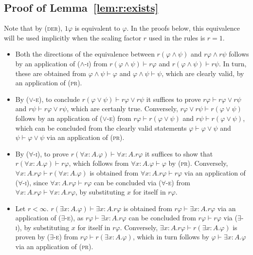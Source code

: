 \documentclass[a4paper,UKenglish,cleveref, autoref, thm-restate]{lipics-v2021}
\begin{document}
\subsection*{Proof of Lemma~\ref{lem:r:exists}}
Note that by (\textsc{der}), $1\varphi$ is equivalent to $\varphi$. In the proofs below, this equivalence will be used implicitly when the scaling factor $r$ used in the rules is $r = 1$. 
\begin{itemize}
\item Both the directions of the equivalence between $r(\varphi \wedge \psi)$ and $r\varphi \wedge r\psi$ follows by an application of (\textsc{$\wedge$-i}) from $r(\varphi \wedge \psi) \vdash r\varphi$ and $r(\varphi \wedge \psi) \vdash r\psi$. In turn, these are obtained from $\varphi \wedge \psi \vdash \varphi$ and $\varphi \wedge \psi \vdash \psi$, which are clearly valid, by an application of (\textsc{pr}).

\item By (\textsc{$\vee$-e}), to conclude $r(\varphi \vee \psi) \vdash r\varphi \vee r\psi$ it 
suffices to prove $r\varphi \vdash r\varphi \vee r\psi$ and $r\psi \vdash r\varphi \vee r\psi$, which are certanly true.
Conversely, $r\varphi \vee r\psi \vdash r(\varphi \vee \psi)$ follows by an application of (\textsc{$\vee$-e}) from $r\varphi \vdash r(\varphi \vee \psi)$ and $r\psi \vdash r(\varphi \vee \psi)$, which can be concluded from the clearly valid statements $\varphi \vdash \varphi \vee \psi$ and $\psi \vdash \varphi \vee \psi$ via an application of (\textsc{pr}).

\item By (\textsc{$\forall$-i}), to prove $r(\forall x:A. \varphi) \vdash \forall x:A. r\varphi$ it 
suffices to show that $r(\forall x:A. \varphi) \vdash r\varphi$, which follows from $\forall x:A. \varphi \vdash \varphi$ by (\textsc{pr}). 
Conversely, $\forall x:A. r\varphi \vdash r(\forall x:A. \varphi)$ is obtained from 
$\forall x:A. r\varphi \vdash r\varphi$ via an application of (\textsc{$\forall$-i}), since  
$\forall x:A. r\varphi \vdash r\varphi$ can be concluded via (\textsc{$\forall$-e}) from $\forall x:A. r\varphi \vdash \forall x:A. r\varphi$, by substituting $x$ for itself in $r\varphi$.

\item Let $r < \infty$. $r(\exists x:A. \varphi) \vdash \exists x:A. r\varphi$ is obtained from 
$r\varphi \vdash \exists x:A. r\varphi$ via an application of (\textsc{$\exists$-e}), as 
$r\varphi \vdash \exists x:A. r\varphi$ can be concluded from $r\varphi \vdash r\varphi$ via (\textsc{$\exists$-i}), by substituting $x$ for itself in $r\varphi$.
Conversely, $\exists x:A. r\varphi \vdash r(\exists x:A. \varphi)$ is proven by (\textsc{$\exists$-e})
from $r\varphi \vdash r(\exists x:A. \varphi)$, which in turn follows by $\varphi \vdash \exists x:A. \varphi$ via an application of (\textsc{pr}).
\end{itemize}
\end{document}
